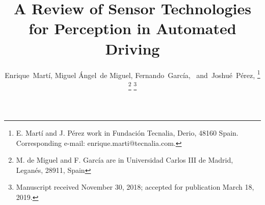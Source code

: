 \documentclass[journal]{IEEEtran}
\begin{document}
%
\title{A Review of Sensor Technologies for Perception in Automated Driving}
%
%
%

\author{Enrique~Mart\'i, %
        Miguel \'Angel~de Miguel, %
		Fernando~Garc\'ia,~
        and~Joshu\'e~P\'erez,%
\thanks{E. Mart\'i and J. P\'erez work in Fundaci\'on Tecnalia, 
	Derio, 48160 Spain. Corresponding e-mail: enrique.marti@tecnalia.com.}%
\thanks{M. de Miguel and F. Garc\'ia are in Universidad Carlos III de Madrid, 
Legan\'es, 28911, Spain}%
\thanks{Manuscript received November 30, 2018; accepted for publication March 18, 2019.}}

% 
%
\end{document}
